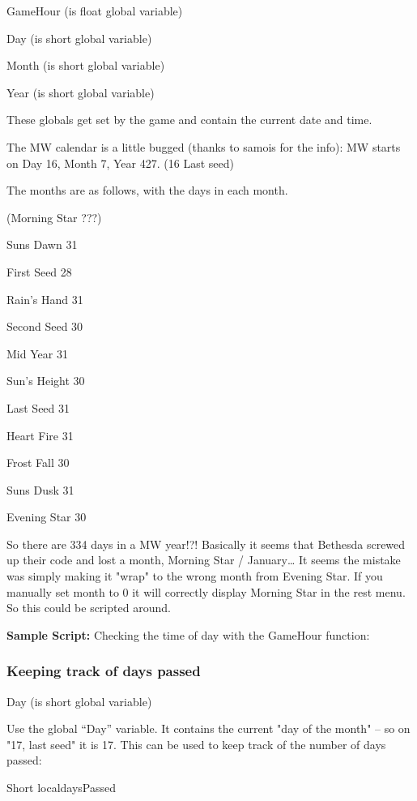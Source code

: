 \documentclass[
]{article}
\begin{document}
GameHour (is float global variable)

Day (is short global variable)

Month (is short global variable)

Year (is short global variable)

These globals get set by the game and contain the current date and time.

The MW calendar is a little bugged (thanks to samois for the info): MW
starts on Day 16, Month 7, Year 427. (16 Last seed)

The months are as follows, with the days in each month.

(Morning Star ???)

Suns Dawn 31

First Seed 28

Rain's Hand 31

Second Seed 30

Mid Year 31

Sun's Height 30

Last Seed 31

Heart Fire 31

Frost Fall 30

Suns Dusk 31

Evening Star 30

So there are 334 days in a MW year!?! Basically it seems that Bethesda
screwed up their code and lost a month, Morning Star / January\ldots{}
It seems the mistake was simply making it "wrap" to the wrong month from
Evening Star. If you manually set month to 0 it will correctly display
Morning Star in the rest menu. So this could be scripted around.

\textbf{Sample Script:} Checking the time of day with the GameHour
function:



\hypertarget{keeping-track-of-days-passed}{%
\subsubsection{Keeping track of days
passed}\label{keeping-track-of-days-passed}}

Day (is short global variable)

Use the global ``Day'' variable. It contains the current "day of the
month" -- so on "17, last seed" it is 17. This can be used to keep track
of the number of days passed:

Short localdaysPassed
\end{document}
